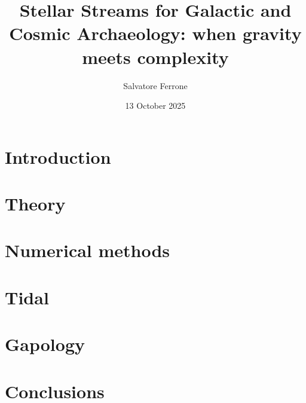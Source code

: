 \documentclass[a4paper,12pt,twoside]{book}
\title{Stellar Streams for Galactic and Cosmic Archaeology: when gravity meets complexity}
\institute{Observatoire de Paris-PSL, LIRA, UMR 8254 CNRS}
\author{Salvatore Ferrone}
\date{13 October 2025}
\begin{document}
\pslcover{}

\frontmatter
\AddResumeAbstract %

\begin{singlespace} %
 {}\adjustmtc
\tableofcontents\newpage
\renewcommand{\listfigurename}{List of Figures}
\listoffigures\adjustmtc %
\listoftables\adjustmtc %
\end{singlespace}

\mainmatter
\setcounter{page}{1}
\chapter{Introduction}


\chapter{Theory}
% 

\chapter{Numerical methods}
% 

\chapter{Tidal}
% 

\chapter{Gapology}
% 

\chapter{Conclusions}
% 

\backmatter
\appendix






\begin{singlespace}
\setlength{}
\small\printbibliography[heading=bibintoc,title=Bibliography]
\end{singlespace}
\end{document}

